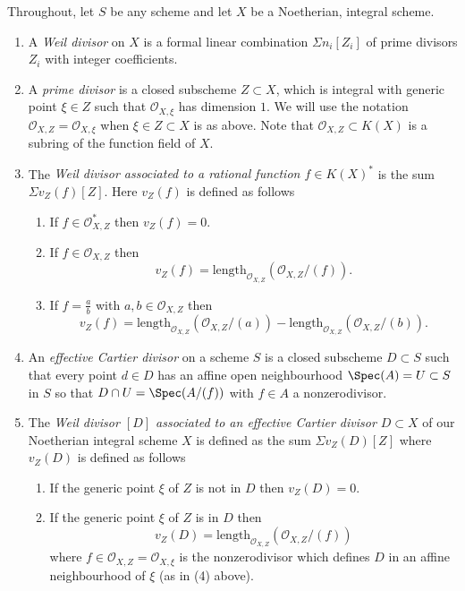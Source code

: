 \begin{definition}
\label{definition-divisor}
Throughout, let $S$ be any scheme and let
$X$ be a Noetherian, integral scheme.
\begin{enumerate}
\item A {\it Weil divisor} on $X$ is a formal linear combination
$\Sigma n_i[Z_i]$ of prime divisors $Z_i$ with integer coefficients.
\item A {\it prime divisor} is a closed subscheme $Z \subset X$,
which is integral with generic point $\xi \in Z$ such that
${\mathcal O}_{X, \xi}$ has dimension $1$. We will use the notation
${\mathcal O}_{X, Z} = {\mathcal O}_{X, \xi}$
when $\xi \in Z \subset X$ is as above. Note that ${\mathcal O}_{X, Z} \subset
K(X)$ is a subring of the function field of $X$.
\item The {\it Weil divisor associated to a rational function
$f \in K(X)^\ast$} is the sum $\Sigma v_Z(f)[Z]$. Here $v_Z(f)$ is
defined as follows
\begin{enumerate}
\item If $f \in {\mathcal O}_{X, Z}^\ast$ then $v_Z(f) = 0$.
\item If $f \in {\mathcal O}_{X, Z}$ then
$$
v_Z(f) = \text{length}_{{\mathcal O}_{X, Z}}({\mathcal O}_{X, Z}/(f)).
$$
\item If $f = \frac{a}{b}$ with $a, b \in {\mathcal O}_{X, Z}$
then
$$
v_Z(f) = \text{length}_{{\mathcal O}_{X, Z}}({\mathcal O}_{X, Z}/(a)) -
\text{length}_{{\mathcal O}_{X, Z}}({\mathcal O}_{X, Z}/(b)).
$$
\end{enumerate}
\item An {\it effective Cartier divisor} on a scheme $S$
is a closed subscheme $D \subset S$ such that every point $d\in D$
has an affine open neighbourhood $\Spec(A) = U \subset S$ in $S$
so that $D \cap U = \Spec(A/(f))$ with $f \in A$ a nonzerodivisor.
\item The {\it Weil divisor $[D]$ associated to an effective
Cartier divisor $D \subset X$} of our Noetherian integral
scheme $X$ is defined as the sum $\Sigma v_Z(D)[Z]$ where
$v_Z(D)$ is defined as follows
\begin{enumerate}
\item If the generic point $\xi$ of $Z$ is not in $D$
then $v_Z(D) = 0$.
\item If the generic point $\xi$ of $Z$ is in $D$
then
$$
v_Z(D) = \text{length}_{{\mathcal O}_{X, Z}}({\mathcal O}_{X, Z}/(f))
$$
where $f \in {\mathcal O}_{X, Z} = {\mathcal O}_{X, \xi}$ is the nonzerodivisor
which defines $D$ in an affine neighbourhood of $\xi$ (as in (4) above).

\end{enumerate}
\end{enumerate}
\end{definition}

